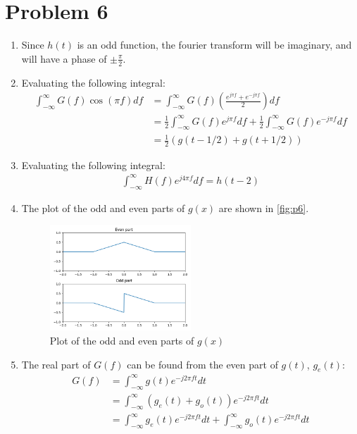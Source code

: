 \documentclass{article}
\begin{document}
\section{Problem 6}

\begin{enumerate}[label=6.\arabic*]
    \item Since $h(t)$ is an odd function, the fourier transform will be imaginary, and will have a phase of $\pm \frac{\pi}{2}$.
    \item Evaluating the following integral:
    \begin{align*}
        \int_{-\infty}^{\infty} G(f)\cos(\pi f)df &= \int_{-\infty}^{\infty} G(f)\left(\frac{e^{j\pi f} + e^{-j\pi f}}{2}\right)df \\
        &= \frac{1}{2}\int_{-\infty}^{\infty} G(f)e^{j\pi f}df + \frac{1}{2}\int_{-\infty}^{\infty} G(f)e^{-j\pi f}df \\
        &=\frac{1}{2}\left( g(t - 1/2) + g(t + 1/2) \right)
    \end{align*}
    \item Evaluating the following integral:
    \begin{align*}
        \int_{-\infty}^{\infty} H(f)e^{j4\pi f} df = h(t - 2)
    \end{align*}

    \item The plot of the odd and even parts of $g(x)$ are shown in \autoref{fig:p6}.

    \begin{figure}[ht!]
        \centering
        \includegraphics[width=0.5\textwidth]{p6.png}
        \caption{Plot of the odd and even parts of $g(x)$}
        \label{fig:p6}
    \end{figure}

    \item The real part of $G(f)$ can be found from the even part of $g(t)$, $g_e(t)$:
    \begin{align*}
        G(f) &= \int_{-\infty}^{\infty} g(t)e^{-j2\pi ft} dt \\
        &= \int_{-\infty}^{\infty} (g_e(t) + g_o(t))e^{-j2\pi ft} dt \\
        &= \int_{-\infty}^{\infty} g_e(t)e^{-j2\pi ft} dt + \int_{-\infty}^{\infty} g_o(t)e^{-j2\pi ft} dt \\
    \end{align*}


\end{enumerate}
\end{document}
